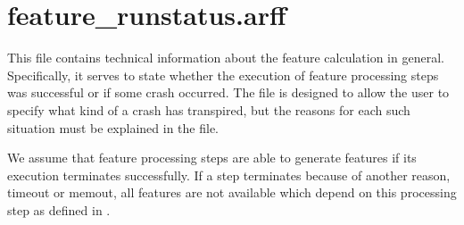\section{feature\_runstatus.arff}

This file contains technical information about the feature calculation in general. Specifically, it serves to state whether 
the execution of feature processing steps was successful or if some crash occurred. The file is designed to allow the user to
specify what kind of a crash has transpired, but the reasons for each such situation must be explained in the 
 file. 

We assume that feature processing steps are able to generate features if its execution terminates successfully.
If a step terminates because of another reason, \eg{} timeout or memout,   
all features are not available which depend on this processing step as defined in .


